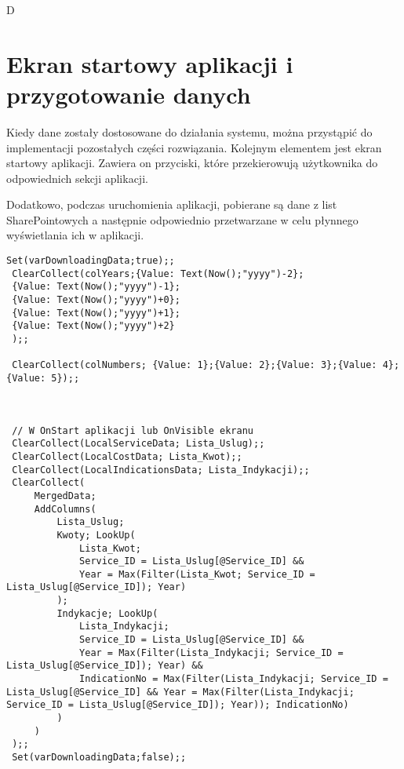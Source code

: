 D\section{Ekran startowy aplikacji i przygotowanie danych}
Kiedy dane zostały dostosowane do działania systemu, można przystąpić do implementacji pozostałych części rozwiązania.
Kolejnym elementem jest ekran startowy aplikacji. Zawiera on przyciski, które przekierowują użytkownika do odpowiednich sekcji aplikacji.


Dodatkowo, podczas uruchomienia aplikacji, pobierane są dane z list SharePointowych a następnie odpowiednio przetwarzane w celu płynnego wyświetlania ich w aplikacji.

\begin{lstlisting}[style=MyStyle]
    Set(varDownloadingData;true);;
 ClearCollect(colYears;{Value: Text(Now();"yyyy")-2};
 {Value: Text(Now();"yyyy")-1};
 {Value: Text(Now();"yyyy")+0};
 {Value: Text(Now();"yyyy")+1};
 {Value: Text(Now();"yyyy")+2}
 );;
 
 ClearCollect(colNumbers; {Value: 1};{Value: 2};{Value: 3};{Value: 4};{Value: 5});;
 
 
 
 // W OnStart aplikacji lub OnVisible ekranu
 ClearCollect(LocalServiceData; Lista_Uslug);;
 ClearCollect(LocalCostData; Lista_Kwot);;
 ClearCollect(LocalIndicationsData; Lista_Indykacji);;
 ClearCollect(
     MergedData;
     AddColumns(
         Lista_Uslug;
         Kwoty; LookUp(
             Lista_Kwot;
             Service_ID = Lista_Uslug[@Service_ID] &&
             Year = Max(Filter(Lista_Kwot; Service_ID = Lista_Uslug[@Service_ID]); Year)
         );
         Indykacje; LookUp(
             Lista_Indykacji;
             Service_ID = Lista_Uslug[@Service_ID] &&
             Year = Max(Filter(Lista_Indykacji; Service_ID = Lista_Uslug[@Service_ID]); Year) &&
             IndicationNo = Max(Filter(Lista_Indykacji; Service_ID = Lista_Uslug[@Service_ID] && Year = Max(Filter(Lista_Indykacji; Service_ID = Lista_Uslug[@Service_ID]); Year)); IndicationNo)
         )
     )
 );;
 Set(varDownloadingData;false);;
\end{lstlisting}
